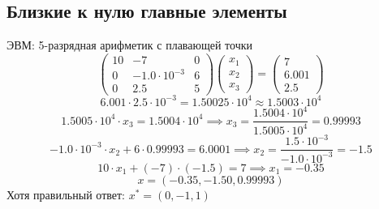 \documentclass[english]{article}
\theoremstyle{plain}
\theoremstyle{remark}
\theoremstyle{definition}
\begin{document}
\subsection{Близкие к нулю главные элементы}
\label{sec:orgfc0c288}
ЭВМ: 5-разрядная арифметик с плавающей точки
\[ \begin{pmatrix}
10 & -7 & 0 \\
0 & -1.0\cdot 10^{-3} & 6 \\
0 & 2.5 & 5
\end{pmatrix}\begin{pmatrix}
x_1 \\
x_2 \\
x_3
\end{pmatrix} = \begin{pmatrix}
7 \\
6.001 \\
2.5
\end{pmatrix}\]
\[ 6.001 \cdot 2.5 \cdot 10^{-3} = 1.50025 \cdot 10^4 \approx 1.5003 \cdot 10^4 \]
\[ 1.5005 \cdot 10^4 \cdot x_3 = 1.5004 \cdot 10^4 \implies x_3 = \frac{1.5004 \cdot 10^4}{1.5005 \cdot 10^4} = 0.99993 \]
\[ -1.0\cdot 10^{-3}\cdot x_2 + 6\cdot 0.99993 = 6.0001 \implies x_2 = \frac{1.5 \cdot 10^{-3}}{-1.0 \cdot 10^{-3}} = -1.5\]
\[ 10\cdot x_1 + (-7) \cdot (-1.5) = 7 \implies x_1 = -0.35 \]
\[ x = (-0.35, -1.50, 0.99993) \]
Хотя правильный ответ: \(x^* = (0, -1, 1)\)
\end{document}
